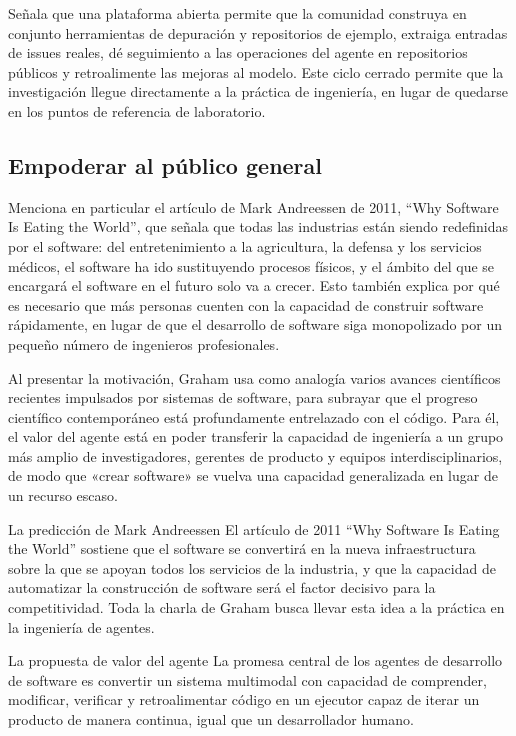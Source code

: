 \documentclass[a4paper]{article}
\begin{document}
Señala que una plataforma abierta permite que la comunidad construya en conjunto herramientas de depuración y repositorios de ejemplo, extraiga entradas de issues reales, dé seguimiento a las operaciones del agente en repositorios públicos y retroalimente las mejoras al modelo. Este ciclo cerrado permite que la investigación llegue directamente a la práctica de ingeniería, en lugar de quedarse en los puntos de referencia de laboratorio.

\subsection{Empoderar al público general}
Menciona en particular el artículo de Mark Andreessen de 2011, ``Why Software Is Eating the World'', que señala que todas las industrias están siendo redefinidas por el software: del entretenimiento a la agricultura, la defensa y los servicios médicos, el software ha ido sustituyendo procesos físicos, y el ámbito del que se encargará el software en el futuro solo va a crecer. Esto también explica por qué es necesario que más personas cuenten con la capacidad de construir software rápidamente, en lugar de que el desarrollo de software siga monopolizado por un pequeño número de ingenieros profesionales.

Al presentar la motivación, Graham usa como analogía varios avances científicos recientes impulsados por sistemas de software, para subrayar que el progreso científico contemporáneo está profundamente entrelazado con el código. Para él, el valor del agente está en poder transferir la capacidad de ingeniería a un grupo más amplio de investigadores, gerentes de producto y equipos interdisciplinarios, de modo que «crear software» se vuelva una capacidad generalizada en lugar de un recurso escaso.

\begin{knowledgebox}{La predicción de Mark Andreessen}
El artículo de 2011 ``Why Software Is Eating the World'' sostiene que el software se convertirá en la nueva infraestructura sobre la que se apoyan todos los servicios de la industria, y que la capacidad de automatizar la construcción de software será el factor decisivo para la competitividad. Toda la charla de Graham busca llevar esta idea a la práctica en la ingeniería de agentes.
\end{knowledgebox}

\begin{importantbox}{La propuesta de valor del agente}
La promesa central de los agentes de desarrollo de software es convertir un sistema multimodal con capacidad de comprender, modificar, verificar y retroalimentar código en un ejecutor capaz de iterar un producto de manera continua, igual que un desarrollador humano.
\end{importantbox}
\end{document}
